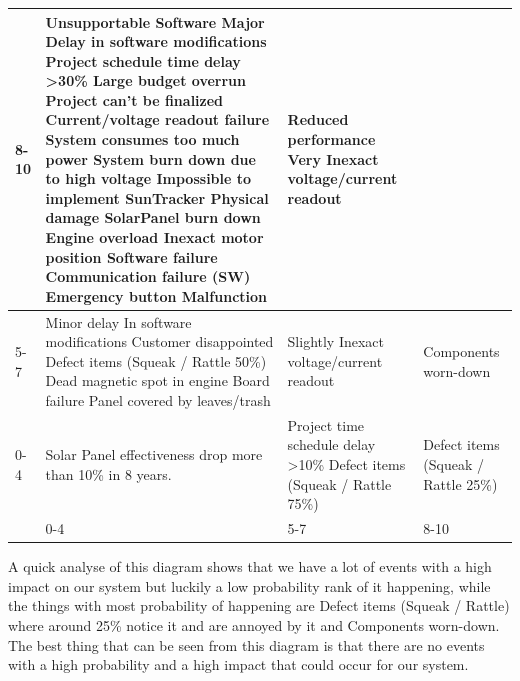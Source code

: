 \documentclass[12pt,a4paper]{report}
\begin{document}
\begin{tabular}{|p{1cm}|p{5.5cm}|p{5.5cm}|p{5.5cm}|}
\hline 8-10 & Unsupportable Software\newline
Major Delay in software modifications \newline
Project schedule time delay \textgreater 30\% \newline
Large budget overrun \newline
Project can’t be finalized \newline
Current/voltage readout failure \newline
System consumes too much power \newline
System burn down due to high voltage \newline
Impossible to implement SunTracker \newline
Physical damage \newline
SolarPanel burn down \newline
Engine overload \newline
Inexact motor position \newline
Software failure \newline
Communication failure (SW) \newline
Emergency button Malfunction & Reduced performance \newline
Very Inexact voltage/current readout &  \\

\hline 5-7 & Minor delay In software modifications\newline
Customer disappointed\newline
Defect items (Squeak / Rattle 50\%)\newline
Dead magnetic spot in engine\newline
Board failure\newline
Panel covered by leaves/trash & Slightly Inexact voltage/current readout & Components worn-down \\ 

\hline 0-4 & Solar Panel effectiveness drop more than 10\% in 8 years. & Project time schedule delay \textgreater 10\% \newline
Defect items (Squeak / Rattle 75\%) & Defect items (Squeak / Rattle 25\%) \\ 

\hline  & 0-4 & 5-7 & 8-10 \\ 

\hline 
\end{tabular} 


A quick analyse of this diagram shows that we have a lot of events with a high impact on our system but luckily a low probability rank of it happening, while the things with most probability of happening are Defect items (Squeak / Rattle) where around 25\% notice it and are annoyed by it and Components worn-down. The best thing that can be seen from this diagram is that there are no events with a high probability and a high impact that could occur for our system.\\
\end{document}

